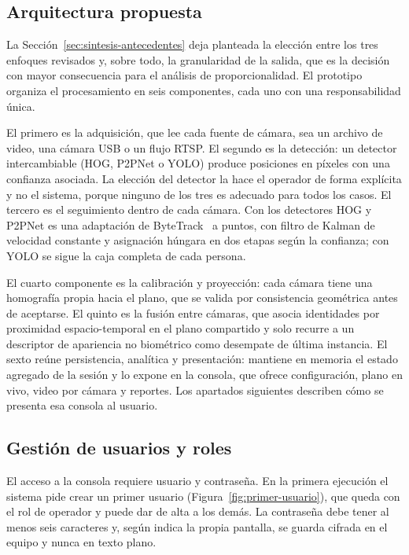 \subsection{Arquitectura propuesta}
\label{sec:arquitectura}

La Sección~\ref{sec:sintesis-antecedentes} deja planteada la elección
entre los tres enfoques revisados y, sobre todo, la granularidad de la
salida, que es la decisión con mayor consecuencia para el análisis de
proporcionalidad. El prototipo organiza el procesamiento en seis
componentes, cada uno con una responsabilidad única.

El primero es la adquisición, que lee cada fuente de cámara, sea un
archivo de video, una cámara USB o un flujo RTSP. El segundo es la
detección: un detector intercambiable (HOG, P2PNet o YOLO) produce
posiciones en píxeles con una confianza asociada. La elección del
detector la hace el operador de forma explícita y no el sistema, porque
ninguno de los tres es adecuado para todos los casos. El tercero es el
seguimiento dentro de cada cámara. Con los detectores HOG y P2PNet es una
adaptación de ByteTrack~\cite{Zhang_2022_ECCV} a puntos, con filtro de
Kalman de velocidad constante y asignación húngara en dos etapas según la
confianza; con YOLO se sigue la caja completa de cada persona.

El cuarto componente es la calibración y proyección: cada cámara tiene
una homografía propia hacia el plano, que se valida por consistencia
geométrica antes de aceptarse. El quinto es la fusión entre cámaras, que
asocia identidades por proximidad espacio-temporal en el plano compartido
y solo recurre a un descriptor de apariencia no biométrico como desempate
de última instancia. El sexto reúne persistencia, analítica y
presentación: mantiene en memoria el estado agregado de la sesión y lo
expone en la consola, que ofrece configuración, plano en vivo, video por
cámara y reportes. Los apartados siguientes describen cómo se presenta
esa consola al usuario.

\subsection{Gestión de usuarios y roles}
\label{sec:diseno-usuarios}

El acceso a la consola requiere usuario y contraseña. En la primera
ejecución el sistema pide crear un primer usuario
(Figura~\ref{fig:primer-usuario}), que queda con el rol de operador y
puede dar de alta a los demás. La contraseña debe tener al menos seis
caracteres y, según indica la propia pantalla, se guarda cifrada en el
equipo y nunca en texto plano.

